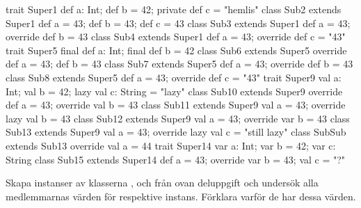 \begin{REPL}
trait Super1 { def a: Int; def b = 42; private def c = "hemlis" }
class Sub2 extends Super1 { def a = 43; def b = 43; def c = 43 }
class Sub3 extends Super1 { def a = 43; override def b = 43 }
class Sub4 extends Super1 { def a = 43; override def c = "43" }
trait Super5 { final def a: Int; final def b = 42 }
class Sub6 extends Super5 { override def a = 43; def b = 43 }
class Sub7 extends Super5 { def a = 43; override def b = 43 }
class Sub8 extends Super5 { def a = 43; override def c = "43" }
trait Super9 { val a: Int; val b = 42; lazy val c: String = "lazy" }
class Sub10 extends Super9 { override def a = 43; override val b = 43 }
class Sub11 extends Super9 { val a = 43; override lazy val b = 43 }
class Sub12 extends Super9 { val a = 43; override var b = 43 }
class Sub13 extends Super9 { val a = 43; override lazy val c = "still lazy" }
class SubSub extends Sub13 { override val a = 44}
trait Super14 { var a: Int; var b = 42; var c: String }
class Sub15 extends Super14 { def a = 43; override var b = 43; val c = "?" }
\end{REPL}

\Subtask Skapa instanser av klasserna ,  och  från ovan deluppgift och undersök alla medlemmarnas värden för respektive instans. Förklara varför de har dessa värden.


\SOLUTION


\TaskSolved \what


